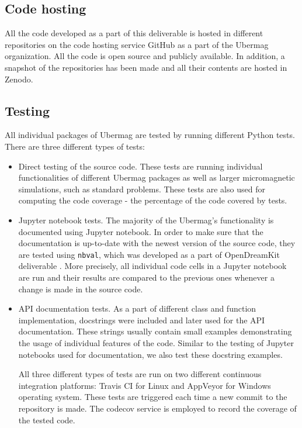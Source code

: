 \documentclass{deliverablereport}
\begin{document}
\subsection{Code hosting}

All the code developed as a part of this deliverable is hosted in different repositories on the code hosting service GitHub as a part of the Ubermag organization. All the code is open source and publicly available. In addition, a snapshot of the repositories has been made and all their contents are hosted in Zenodo.

\subsection{Testing}

All individual packages of Ubermag are tested by running different Python tests. There are three different types of tests:

\begin{itemize}
\item Direct testing of the source code. These tests are running individual functionalities of different Ubermag packages as well as larger micromagnetic simulations, such as standard problems. These tests are also used for computing the code coverage - the percentage of the code covered by tests.
\item Jupyter notebook tests. The majority of the Ubermag's functionality is documented using Jupyter notebook. In order to make sure that the documentation is up-to-date with the newest version of the source code, they are tested using \texttt{nbval}, which was developed as a part of OpenDreamKit deliverable . More precisely, all individual code cells in a Jupyter notebook are run and their results are compared to the previous ones whenever a change is made in the source code.
\item API documentation tests. As a part of different class and function implementation, docstrings were included and later used for the API documentation. These strings usually contain small examples demonstrating the usage of individual features of the code. Similar to the testing of Jupyter notebooks used for documentation, we also test these docstring examples.

  All three different types of tests are run on two different continuous integration platforms: Travis CI for Linux and AppVeyor for Windows operating system. These tests are triggered each time a new commit to the repository is made. The codecov service is employed to record the coverage of the tested code.
\end{itemize}
\end{document}
